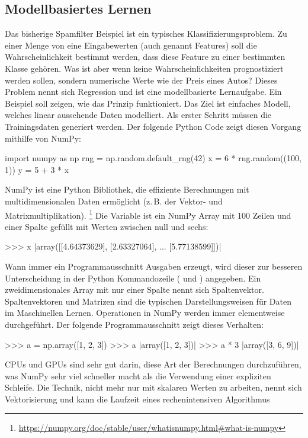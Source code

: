 \subsection{Modellbasiertes Lernen}
Das bisherige Spamfilter Beispiel ist ein typisches
Klassifizierungsproblem. Zu einer Menge von eine Eingabewerten
(auch genannt Features) soll die Wahrscheinlichkeit bestimmt werden,
dass diese Feature zu einer bestimmten Klasse gehören.
Was ist aber wenn keine Wahrscheinlichkeiten
prognostiziert werden sollen, sondern numerische Werte wie
der Preis eines Autos? Dieses Problem nennt sich Regression und
ist eine modellbasierte Lernaufgabe.
Ein Beispiel soll zeigen, wie das Prinzip funktioniert.
Das Ziel ist einfaches Modell, welches linear aussehende Daten modelliert.
Als erster Schritt müssen die Trainingsdaten generiert werden.
Der folgende Python Code zeigt diesen Vorgang mithilfe von NumPy:
\begin{pythoncode}
import numpy as np
rng = np.random.default_rng(42)
x = 6 * rng.random((100, 1))
y = 5 + 3 * x
\end{pythoncode}
NumPy ist eine Python Bibliothek, die effiziente Berechnungen mit
multidimensionalen Daten ermöglicht (z.\,B. der Vektor- und Matrixmultiplikation).
\footnote{\url{https://numpy.org/doc/stable/user/whatisnumpy.html\#what-is-numpy}}
Die Variable  ist ein NumPy Array mit 100 Zeilen und einer Spalte
gefüllt mit Werten zwischen null und sechs:
\begin{pythoncode}
>>> x
|array([[4.64373629],
       [2.63327064],
       ...
       [5.77138599]])|
\end{pythoncode}
Wann immer ein Programmausschnitt Ausgaben erzeugt, wird
dieser zur besseren Unterscheidung in der Python Kommandozeile
(\pythoninline{>>>} und ) angegeben.
Ein zweidimensionales Array mit nur einer Spalte nennt sich Spaltenvektor.
Spaltenvektoren und Matrizen sind die typischen Darstellungsweisen
für Daten im Maschinellen Lernen.
Operationen in NumPy werden immer elementweise durchgeführt. Der folgende Programmausschnitt
zeigt dieses Verhalten:
\begin{pythoncode}
>>> a = np.array([1, 2, 3])
>>> a
|array([1, 2, 3])|
>>> a * 3
|array([3, 6, 9])|
\end{pythoncode}
CPUs und GPUs sind sehr gut darin, diese Art der Berechnungen durchzuführen,
was NumPy sehr viel schneller macht als die Verwendung einer expliziten Schleife.
Die Technik, nicht mehr nur mit skalaren Werten zu arbeiten,
nennt sich Vektorisierung und kann
die Laufzeit eines rechenintensiven Algorithmus
